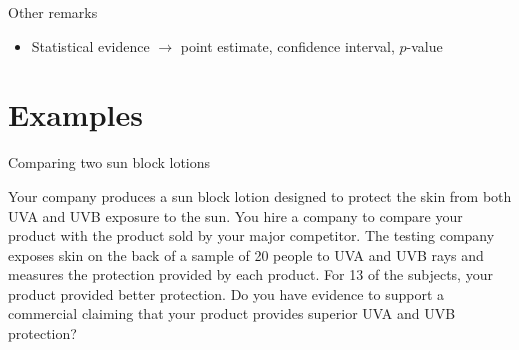 \documentclass{beamer}\usepackage[]{graphicx}\usepackage[]{color}
\begin{document}
\begin{frame}{Other remarks}

\begin{itemize}
	\setlength\itemsep{.51em}
	\item Statistical evidence $\to$ point estimate, confidence interval, $p$-value
\end{itemize}




\end{frame}


























\section{Examples}



\begin{frame}{Comparing two sun block lotions}

\begin{example}
	Your company produces a sun block lotion designed to protect the skin from both UVA and UVB exposure to the sun. You hire a company to compare your product with the product sold by your major competitor. The testing company exposes skin on the back of a sample of 20 people to UVA and UVB rays and measures the protection provided by each product. For 13 of the subjects, your product provided better protection. Do you have evidence to support a commercial claiming that your product provides superior UVA and UVB protection?
\end{example}


\end{frame}
\end{document}
